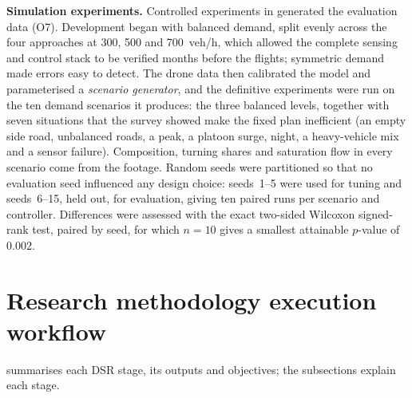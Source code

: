 \textbf{Simulation experiments.} Controlled experiments in \sumo{} generated the evaluation data (O7). Development began with balanced demand, split evenly across the four approaches at 300, 500 and 700~veh/h, which allowed the complete sensing and control stack to be verified months before the flights; symmetric demand made errors easy to detect. The drone data then calibrated the model and parameterised a \emph{scenario generator}, and the definitive experiments were run on the ten demand scenarios it produces: the three balanced levels, together with seven situations that the survey showed make the fixed plan inefficient (an empty side road, unbalanced roads, a peak, a platoon surge, night, a heavy-vehicle mix and a sensor failure). Composition, turning shares and saturation flow in every scenario come from the footage. Random seeds were partitioned so that no evaluation seed influenced any design choice: seeds~1--5 were used for tuning and seeds~6--15, held out, for evaluation, giving ten paired runs per scenario and controller. Differences were assessed with the exact two-sided Wilcoxon signed-rank test, paired by seed, for which $n=10$ gives a smallest attainable $p$-value of 0.002.

\section{Research methodology execution workflow}\label{sec:method-workflow}

 summarises each DSR stage, its outputs and objectives; the subsections explain each stage.

